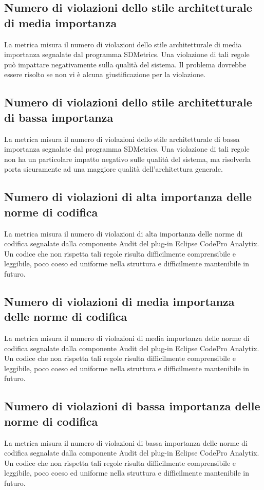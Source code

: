 \subsection{Numero di violazioni dello stile architetturale di media importanza}
La metrica misura il numero di violazioni dello stile architetturale di media importanza segnalate dal programma SDMetrics. Una violazione di tali regole può impattare negativamente sulla qualità del sistema. Il problema dovrebbe essere risolto se non vi è alcuna giustificazione per la violazione.

\subsection{Numero di violazioni dello stile architetturale di bassa importanza}
La metrica misura il numero di violazioni dello stile architetturale di bassa importanza segnalate dal programma SDMetrics. Una violazione di tali regole non ha un particolare impatto negativo sulle qualità del sistema, ma risolverla porta sicuramente ad una maggiore qualità dell'architettura generale.

\subsection{Numero di violazioni di alta importanza delle norme di codifica}
La metrica misura il numero di violazioni di alta importanza delle norme di codifica segnalate dalla componente Audit del plug-in Eclipse CodePro Analytix. Un codice che non rispetta tali regole risulta difficilmente comprensibile e leggibile, poco coeso ed uniforme nella struttura e difficilmente mantenibile in futuro.

\subsection{Numero di violazioni di media importanza delle norme di codifica}
La metrica misura il numero di violazioni di media importanza delle norme di codifica segnalate dalla componente Audit del plug-in Eclipse CodePro Analytix. Un codice che non rispetta tali regole risulta difficilmente comprensibile e leggibile, poco coeso ed uniforme nella struttura e difficilmente mantenibile in futuro.

\subsection{Numero di violazioni di bassa importanza delle norme di codifica}
La metrica misura il numero di violazioni di bassa importanza delle norme di codifica segnalate dalla componente Audit del plug-in Eclipse CodePro Analytix. Un codice che non rispetta tali regole risulta difficilmente comprensibile e leggibile, poco coeso ed uniforme nella struttura e difficilmente mantenibile in futuro.

